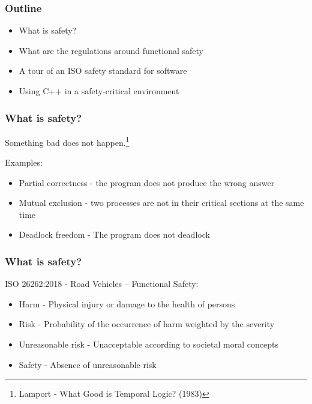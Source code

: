 \documentclass[aspectratio=169]{beamer}
\newif\iftransitions
\newcommand{\cpause}{\iftransitions \pause \fi}
\begin{document}
\begin{frame}
  \frametitle{Outline}
  
  \begin{itemize}
    \item What is safety?
    \item What are the regulations around functional safety
    \item A tour of an ISO safety standard for software
    \item Using C++ in a safety-critical environment
  \end{itemize}
\end{frame}

\begin{frame}

  \frametitle{What is safety?}
  
  \begin{center}
  Something bad does not happen.\footnote{Lamport - What Good is Temporal Logic? (1983)}
  \end{center}
  
  \cpause
  Examples:
  \begin{itemize}
    \item Partial correctness - the program does not produce the wrong answer \cpause
    \item Mutual exclusion - two processes are not in their critical sections at the same time \cpause
    \item Deadlock freedom - The program does not deadlock
  \end{itemize}

\end{frame}

\begin{frame}
  \frametitle{What is safety?}

  ISO 26262:2018 - Road Vehicles -- Functional Safety:
  \begin{itemize}
  \item Harm - Physical injury or damage to the health of persons \cpause
  \item Risk - Probability of the occurrence of harm weighted by the severity \cpause
  \item Unreasonable risk - Unacceptable according to societal moral concepts \cpause
  \item Safety - Absence of unreasonable risk
  \end{itemize}

\end{frame}
\end{document}
